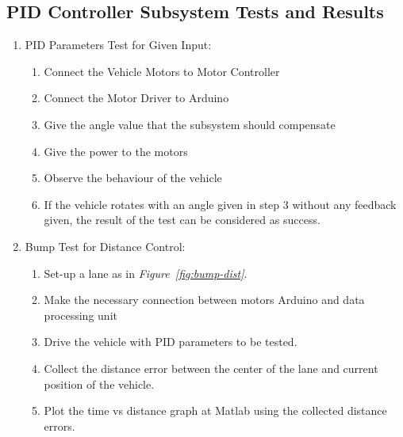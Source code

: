 \documentclass[a4paper,12pt]{article}
\begin{document}




\subsection {PID Controller Subsystem Tests and Results}	

\begin{enumerate}



\item PID Parameters Test for Given Input:	 \label{test:a}	

\begin{enumerate}

\item Connect the Vehicle Motors to Motor Controller  

\item Connect the Motor Driver to Arduino  

\item Give the angle value that the subsystem should compensate   

\item Give the power to the motors  

\item Observe the behaviour of the vehicle  

\item If the vehicle rotates with an angle given in step 3 without any feedback given, the result of the test can be considered as success.  

\end{enumerate}


\item Bump Test for Distance Control: \label{test:b}	

\begin{enumerate}

\item Set-up a lane as in \textit{Figure~\ref{fig:bump-dist}}.

\item Make the necessary connection between motors Arduino and data processing unit  

\item Drive the vehicle with PID parameters to be tested.

\item Collect the distance error between the center of the lane and current position of the vehicle.

\item Plot the time vs distance graph at Matlab using the collected distance errors.


\end{enumerate}
\end{enumerate}
\end{document}

